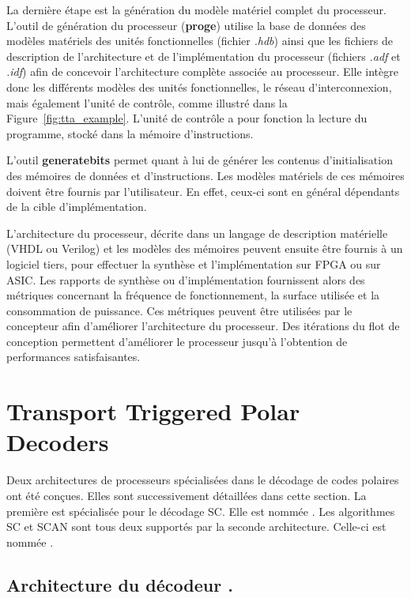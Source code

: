 La dernière étape est la génération du modèle matériel complet du processeur. L'outil de génération du processeur (\textbf{proge}) utilise la base de données des modèles matériels des unités fonctionnelles (fichier \textit{.hdb}) ainsi que les fichiers de description de l'architecture et de l'implémentation du processeur (fichiers \textit{.adf} et \textit{.idf}) afin de concevoir l'architecture complète associée au processeur. Elle intègre donc les différents modèles des unités fonctionnelles, le réseau d'interconnexion, mais également l'unité de contrôle, comme illustré dans la Figure~\ref{fig:tta_example}. L'unité de contrôle a pour fonction la lecture du programme, stocké dans la mémoire d'instructions.

L'outil \textbf{generatebits} permet quant à lui de générer les contenus d'initialisation des mémoires de données et d'instructions. Les modèles matériels de ces mémoires doivent être fournis par l'utilisateur. En effet, ceux-ci sont en général dépendants de la cible d'implémentation.

L'architecture du processeur, décrite dans un langage de description matérielle (VHDL ou Verilog) et les modèles des mémoires peuvent ensuite être fournis à un logiciel tiers, pour effectuer la synthèse et l'implémentation sur FPGA ou sur ASIC. Les rapports de synthèse ou d'implémentation fournissent alors des métriques concernant la fréquence de fonctionnement, la surface utilisée et la consommation de puissance. Ces métriques peuvent être utilisées par le concepteur afin d'améliorer l'architecture du processeur. Des itérations du flot de conception permettent d'améliorer le processeur jusqu'à l'obtention de performances satisfaisantes.



\section{Transport Triggered Polar Decoders}
\label{sec:tta_design}

Deux architectures de processeurs spécialisées dans le décodage de codes polaires ont été conçues. Elles sont successivement détaillées dans cette section. La première est spécialisée pour le décodage SC. Elle est nommée \TTSC. Les algorithmes SC et SCAN sont tous deux supportés par la seconde architecture. Celle-ci est nommée \TTSCAN.

\subsection{Architecture du décodeur \TTSC.}


